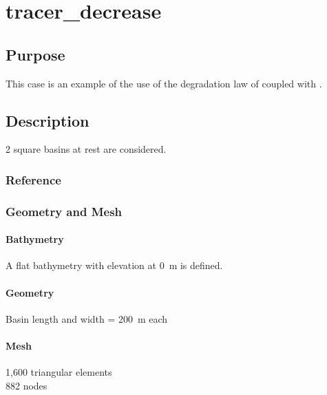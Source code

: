 \chapter{tracer\_decrease}
%
%
\section{Purpose}
%
This case is an example of the use of the degradation law of \waqtel coupled with .
%
\section{Description}
%
2 square basins at rest are considered.
%
%
%
%
\subsection{Reference}
%

%
%
%
\subsection{Geometry and Mesh}
%
\subsubsection{Bathymetry}
%
A flat bathymetry with elevation at 0~m is defined.
%
\subsubsection{Geometry}
%
Basin length and width = 200~m each
%
\subsubsection{Mesh}
%
1,600 triangular elements\\
882 nodes
%
%
%
